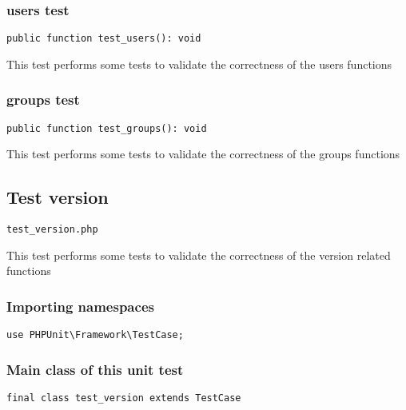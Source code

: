 \documentclass[a4paper]{article}
\begin{document}
\hypertarget{toc386}{}
\subsubsection{users test}

\begin{lstlisting}
public function test_users(): void
\end{lstlisting}

This test performs some tests to validate the correctness
of the users functions

\hypertarget{toc387}{}
\subsubsection{groups test}

\begin{lstlisting}
public function test_groups(): void
\end{lstlisting}

This test performs some tests to validate the correctness
of the groups functions

\hypertarget{toc388}{}
\subsection{Test version}

\begin{lstlisting}
test_version.php
\end{lstlisting}

This test performs some tests to validate the correctness
of the version related functions

\hypertarget{toc389}{}
\subsubsection{Importing namespaces}

\begin{lstlisting}
use PHPUnit\Framework\TestCase;
\end{lstlisting}

\hypertarget{toc390}{}
\subsubsection{Main class of this unit test}

\begin{lstlisting}
final class test_version extends TestCase
\end{lstlisting}
\end{document}
